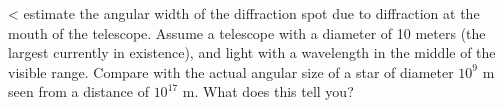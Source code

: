 <%
estimate the angular width of the diffraction spot due
to diffraction at the mouth of the telescope. Assume a
telescope with a diameter of 10 meters (the largest
currently in existence), and light with a wavelength in the
middle of the visible range. Compare with the actual angular
size of a star of diameter $10^9$ m seen from a distance of
$10^{17}$ m. What does this tell you?
